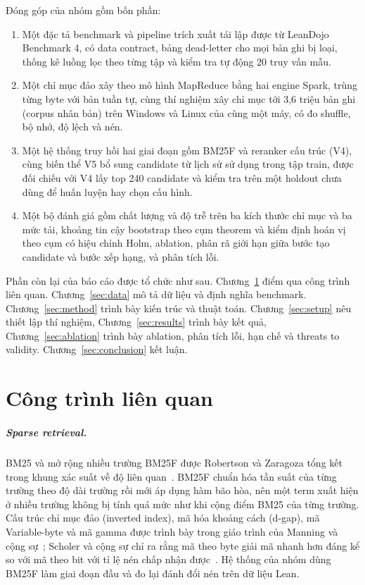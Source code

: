 \documentclass[11pt,a4paper,oneside]{report}
\begin{document}
Đóng góp của nhóm gồm bốn phần:
\begin{enumerate}[leftmargin=*]
  \item Một đặc tả benchmark và pipeline trích xuất tái lập được từ LeanDojo Benchmark 4, có data contract, bảng
        dead-letter cho mọi bản ghi bị loại, thống kê luồng lọc theo từng tập và kiểm tra tự động 20 truy vấn mẫu.
  \item Một chỉ mục đảo xây theo mô hình MapReduce bằng hai engine Spark, trùng từng byte với bản tuần tự, cùng thí
        nghiệm xây chỉ mục tới 3,6 triệu bản ghi (corpus nhân bản) trên Windows và Linux của cùng một máy, có đo
        shuffle, bộ nhớ, độ lệch và nén.
  \item Một hệ thống truy hồi hai giai đoạn gồm BM25F và reranker cấu trúc (V4), cùng biến thể V5 bổ sung candidate từ
        lịch sử sử dụng trong tập train, được đối chiếu với V4 lấy top 240 candidate và kiểm tra trên một holdout chưa
        dùng để huấn luyện hay chọn cấu hình.
  \item Một bộ đánh giá gồm chất lượng và độ trễ trên ba kích thước chỉ mục và ba mức tải, khoảng tin cậy bootstrap
        theo cụm theorem và kiểm định hoán vị theo cụm có hiệu chỉnh Holm, ablation, phân rã giới hạn giữa bước tạo
        candidate và bước xếp hạng, và phân tích lỗi.
\end{enumerate}

Phần còn lại của báo cáo được tổ chức như sau. Chương~\ref{sec:related} điểm qua công trình liên quan.
Chương~\ref{sec:data} mô tả dữ liệu và định nghĩa benchmark. Chương~\ref{sec:method} trình bày kiến trúc và thuật toán.
Chương~\ref{sec:setup} nêu thiết lập thí nghiệm, Chương~\ref{sec:results} trình bày kết quả, Chương~\ref{sec:ablation}
trình bày ablation, phân tích lỗi, hạn chế và threats to validity. Chương~\ref{sec:conclusion} kết luận.

\chapter{Công trình liên quan}\label{sec:related}

\paragraph{Sparse retrieval.} BM25 và mở rộng nhiều trường BM25F được Robertson và Zaragoza tổng kết trong khung xác
suất về độ liên quan~\cite{robertson2009}. BM25F chuẩn hóa tần suất của từng trường theo độ dài trường rồi mới áp dụng
hàm bão hòa, nên một term xuất hiện ở nhiều trường không bị tính quá mức như khi cộng điểm BM25 của từng trường. Cấu trúc
chỉ mục đảo (inverted index), mã hóa khoảng cách (d-gap), mã Variable-byte và mã gamma được trình bày trong giáo trình của
Manning và cộng sự~\cite{manning2008}; Scholer và cộng sự chỉ ra rằng mã theo byte giải mã nhanh hơn đáng kể so với mã
theo bit với tỉ lệ nén chấp nhận được~\cite{scholer2002}. Hệ thống của nhóm dùng BM25F làm giai đoạn đầu và đo lại đánh
đổi nén trên dữ liệu Lean.
\end{document}
